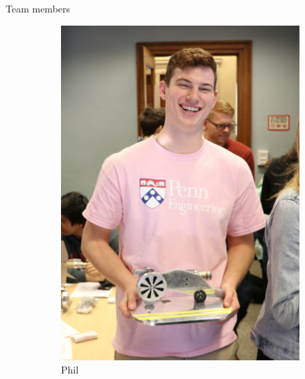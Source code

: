 
\begin{frame}{Team members}

\begin{figure}[h!]
    \centering
    \begin{subfigure}[b]{0.21\linewidth}
        \includegraphics[scale=0.1]{figures/Phil.png}
        \caption{Phil}
        \label{fig:Phil}
    \end{subfigure}
    \quad
    \begin{subfigure}[b]{0.22\linewidth}

\end{subfigure}
\end{figure}
\end{frame}

